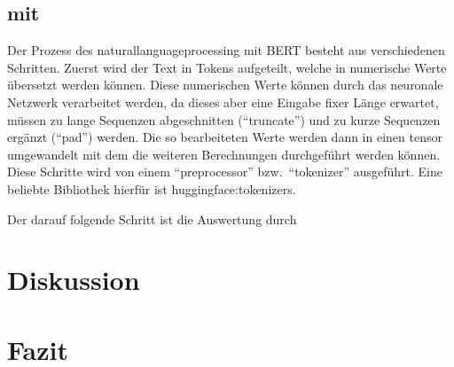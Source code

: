 \documentclass[
german,
]{bachelor}
\begin{document}
\subsection{ mit }
Der Prozess des \gls{naturallanguageprocessing} mit \gls{BERT} besteht aus verschiedenen Schritten.
Zuerst wird der Text in Tokens aufgeteilt,
welche in numerische Werte übersetzt werden können.
Diese numerischen Werte können durch das neuronale Netzwerk verarbeitet werden,
da dieses aber eine Eingabe fixer Länge erwartet,
müssen zu lange Sequenzen abgeschnitten (\enquote{truncate})
und zu kurze Sequenzen ergänzt (\enquote{pad}) werden.
Die so bearbeiteten Werte werden dann in einen \gls{tensor} umgewandelt
mit dem die weiteren Berechnungen durchgeführt werden können.
Diese Schritte wird von einem \enquote{preprocessor}
bzw.\, \enquote{tokenizer} ausgeführt.
\autocite{huggingface:docs:Transformers:preprocessing}
Eine beliebte Bibliothek hierfür ist \gls{huggingface:tokenizers}.



Der darauf folgende Schritt ist die Auswertung durch


\section{Diskussion}

\section{Fazit}
\end{document}
